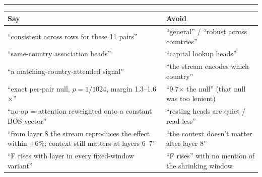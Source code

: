 \documentclass[10pt]{article}
\newcommand{\head}[1]{\par\vspace{5pt}{\large\bfseries #1}\\[-4pt]\rule{\linewidth}{0.5pt}\par}
\begin{document}
\head{Say this, not that (verified wording)}
{\small
\begin{tabularx}{\linewidth}{@{}>{\raggedright\arraybackslash}X >{\raggedright\arraybackslash}X@{}}
\textbf{Say} & \textbf{Avoid} \\ \hline
``consistent across rows for these 11 pairs'' & ``general'' / ``robust across countries'' \\
``same-country association heads'' & ``capital lookup heads'' \\
``a matching-country-attended signal'' & ``the stream encodes which country'' \\
``exact per-pair null, $p = 1/1024$, margin 1.3--1.6$\times$'' & ``9.7$\times$ the null'' (that null was too lenient) \\
``no-op = attention reweighted onto a constant BOS vector'' & ``resting heads are quiet / read less'' \\
``from layer 8 the stream reproduces the effect within $\pm 6\%$; context still matters at layers 6--7'' & ``the context doesn't matter after layer 8'' \\
``F rises with layer in every fixed-window variant'' & ``F rises'' with no mention of the shrinking window \\
\end{tabularx}}
\end{document}
